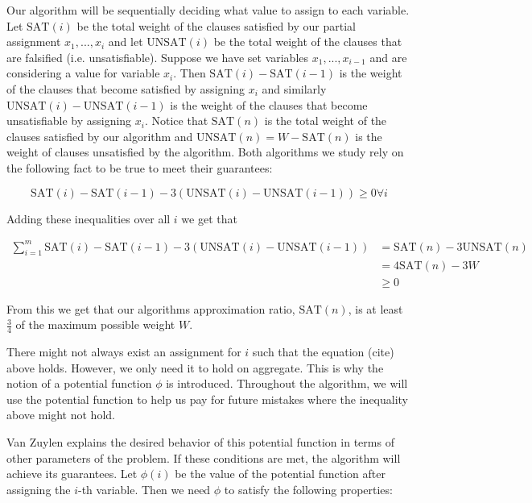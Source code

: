 \documentclass[11pt,letter]{article}
\begin{document}
Our algorithm will be sequentially deciding what value to assign to each variable. Let $\text{SAT}(i)$ be the total weight of the clauses
satisfied by our partial assignment $x_1, ..., x_i$ and let $\text{UNSAT}(i)$ be the total weight of the clauses that are falsified (i.e. unsatisfiable).
Suppose we have set variables $x_1,...,x_{i-1}$ and are considering a value for variable $x_i$. Then $\text{SAT}(i)-\text{SAT}(i-1)$ is the weight
of the clauses that become satisfied by assigning $x_i$ and similarly $\text{UNSAT}(i) - \text{UNSAT}(i-1)$ is the weight of the clauses that become
unsatisfiable by assigning $x_i$.
Notice that $\text{SAT}(n)$ is the total weight of the clauses satisfied by our algorithm and $\text{UNSAT}(n) = W - \text{SAT}(n)$ is the weight of clauses
unsatisfied by the algorithm. Both algorithms we study rely on the following fact to be true to meet their guarantees:

\begin{equation}
\label{eq:1}
\text{SAT}(i)-\text{SAT}(i-1) - 3\left(\text{UNSAT}(i) - \text{UNSAT}(i-1)\right) \geq 0 \forall i
\end{equation}

Adding these inequalities over all $i$ we get that

\begin{equation*}
\begin{aligned}
\sum_{i = 1}^{m} \text{SAT}(i)-\text{SAT}(i-1) - 3\left(\text{UNSAT}(i) - \text{UNSAT}(i-1)\right)  & = \text{SAT}(n) - 3\text{UNSAT}(n) \\
& = 4\text{SAT}(n) - 3W \\
& \geq 0
\end{aligned}
\end{equation*}

From this we get that our algorithms approximation ratio, $\text{SAT}(n)$, is at least $\frac{3}{4}$ of the maximum possible weight $W$.

There might not always exist an assignment for $i$ such that the equation (cite) above holds. However, we only need it to hold on aggregate.
This is why the notion of a potential function $\phi$ is introduced. Throughout the algorithm, we will use the potential function to help us pay
for future mistakes where the inequality above might not hold.

Van Zuylen explains the desired behavior of this potential function in terms of other parameters of the problem. If these conditions are met, the algorithm
will achieve its guarantees. Let $\phi(i)$ be the value of the potential function after assigning the $i$-th variable. Then we need $\phi$ to satisfy the following properties:
\end{document}
